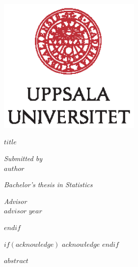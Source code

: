 \documentclass[a4paper,11pt]{article}
\renewcommand{\baselinestretch}{1.5}
\begin{document}
\thispagestyle{empty}
\begin{center}
\includegraphics[width=7cm]{UU_logo_CMYK.eps}
\end{center}
\vspace{1.5cm}
\begin{center}
\begin{Large}
{\bf $title$} 
\end{Large}
\end{center}
\vskip2.5cm
\renewcommand{\baselinestretch}{1}
\begin{center}
{\large\it Submitted by} \\
{\large $author$} 

\vskip2.5cm
\begin{center}
\begin{large}
{\it Bachelor's thesis in Statistics}\\
\end{large}
\end{center}
\vskip2cm
{\large\it Advisor}\\
{\large $advisor$} 
\vskip2cm
{\large $year$} 
\end{center}\vfill
$endif$


$if(acknowledge)$
\newpage
$acknowledge$
$endif$
\pagestyle{plain}
\setcounter{page}{1}    %

\newpage
$abstract$

\newpage
\tableofcontents
\clearpage
\end{document}
